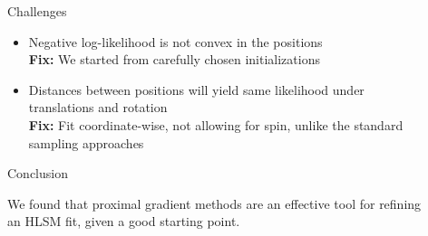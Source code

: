 \documentclass[final]{beamer}
\newlength{\sepwid}
\newlength{\onecolwid}
\newlength{\twocolwid}
\begin{document}
\begin{frame}[t]
\begin{columns}[t]
\begin{column}{\twocolwid}
\end{column} %

\begin{column}{\sepwid}\end{column} %

\begin{column}{\onecolwid} %

  \begin{block}{Challenges}

    \begin{itemize}
    \item Negative log-likelihood is not convex in the positions\\
      \textbf{Fix:} We started from carefully chosen initializations
    \item Distances between positions will yield same likelihood under
      translations and rotation\\
      \textbf{Fix:} Fit coordinate-wise, not allowing for spin, unlike the
      standard sampling approaches
    \end{itemize}

\end{block}


%
%



\begin{block}{Conclusion}

We found that proximal gradient methods are an effective tool for
refining an HLSM fit, given a good starting point.


\end{block}




\end{column}
\end{columns}
\end{frame}
\end{document}
